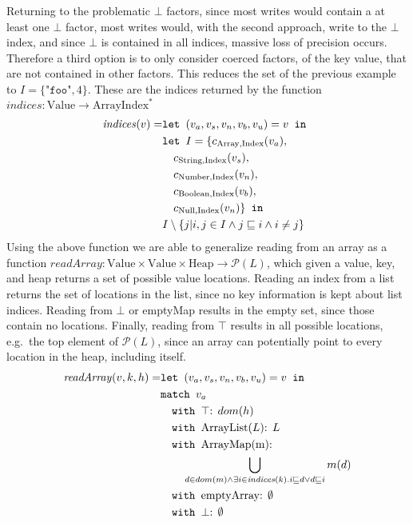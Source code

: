 Returning to the problematic $\bot$ factors, since most writes would contain a at least one $\bot$ factor, most writes would, with the second approach, write to the $\bot$ index, and since $\bot$ is contained in all indices, massive loss of precision occurs. Therefore a third option is to only consider coerced factors, of the key value, that are not contained in other factors. This reduces the set of the previous example to $I = \{\texttt{"foo"}, 4\}$. These are the indices returned by the function $\mathit{indices}: \text{Value} \rightarrow \text{ArrayIndex}^*$
\newcommand{\is}{\texttt{ is }}
\begin{align}
    \mathit{indices}(v) =    &\texttt{let } (v_a,v_s, v_n, v_b, v_u) = v \texttt{ in }\notag\\
                    & \texttt{let } I = \{ c_{\text{Array}, \text{Index}}(v_a),\notag\\
                    &\quad c_{\text{String}, \text{Index}}(v_s),\notag\\
                    &\quad c_{\text{Number}, \text{Index}}(v_n),\notag\\
                    &\quad c_{\text{Boolean}, \text{Index}}(v_b),\notag\\
                    &\quad c_{\text{Null}, \text{Index}}(v_n) \} \texttt{ in }\notag\\
                    &I \setminus \{j|i,j\in I \wedge j\sqsubseteq i \wedge i \neq j \}
\end{align}
Using the above function we are able to generalize reading from an array as a function $\mathit{readArray}: \text{Value} \times \text{Value} \times \text{Heap} \rightarrow \mathcal{P}(L)$, which given a value, key, and heap returns a set of possible value locations. Reading an index from a list returns the set of locations in the list, since no key information is kept about list indices. Reading from $\bot$ or emptyMap results in the empty set, since those contain no locations. Finally, reading from $\top$ results in all possible locations, e.g.\ the top element of $\mathcal{P}(L)$, since an array can potentially point to every location in the heap, including itself.
\begin{align}
\mathit{readArray}(v,k,h) =            &\texttt{let } (v_a,v_s,v_n,v_b,v_u) = v \texttt{ in }\notag\\
                            &\texttt{match }v_a\notag\\
                            &\quad\texttt{with }\top\text{: } dom(h) \notag\\
                            &\quad\texttt{with }\text{ArrayList}(L)\text{: } L \notag\\
                            &\quad\texttt{with }\text{ArrayMap(m)}\text{: } \notag\\
                            & \quad\quad \bigcup_{d \in dom(m) \wedge \exists i \in \mathit{indices}(k).i\sqsubseteq d \vee d \sqsubseteq i } m(d)\notag\\
                            &\quad\texttt{with }\text{emptyArray}\text{: } \emptyset \notag\\
                            &\quad\texttt{with }\bot\text{: } \emptyset
\end{align}

